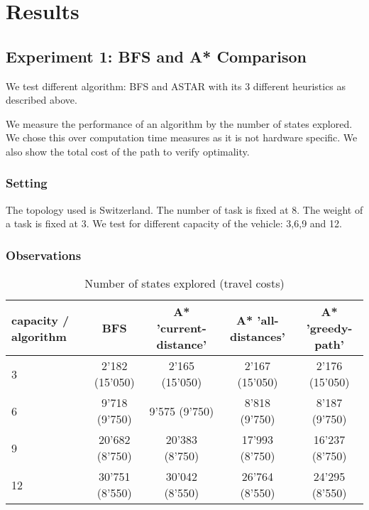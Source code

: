 \documentclass[11pt]{article}
\begin{document}
\section{Results}

\subsection{Experiment 1: BFS and A* Comparison}
We test different algorithm: BFS and ASTAR with its 3 different heuristics as described above.

We measure the performance of an algorithm by the number of states explored. We chose this over computation time measures as it is not hardware specific. We also show the total cost of the path to verify optimality.

\subsubsection{Setting}
The topology used is Switzerland. The number of task is fixed at 8. The weight of a task is fixed at 3. We test for different capacity of the vehicle: 3,6,9 and 12.

\subsubsection{Observations}

\begin{table}[H]
\centering
\begin{tabular}{|l|c|c|c|c|}
\hline
 capacity / algorithm    & BFS & A* 'current-distance' & A* 'all-distances' & A* 'greedy-path' \\ \hline
   3 &  2'182 (15'050) & 2'165 (15'050) & 2'167 (15'050) &  2'176 (15'050) \\ \hline
 6    & 9'718 (9'750) & 9'575 (9'750) &  8'818 (9'750) &  8'187 (9'750) \\ \hline
 9 & 20'682 (8'750) & 20'383 (8'750) & 17'993 (8'750) &   16'237 (8'750)     \\ \hline
 12 & 30'751 (8'550) & 30'042 (8'550) &26'764 (8'550)   & 24'295 (8'550)  \\ \hline
\end{tabular}
\caption{Number of states explored (travel costs)}
\end{table}
\end{document}
